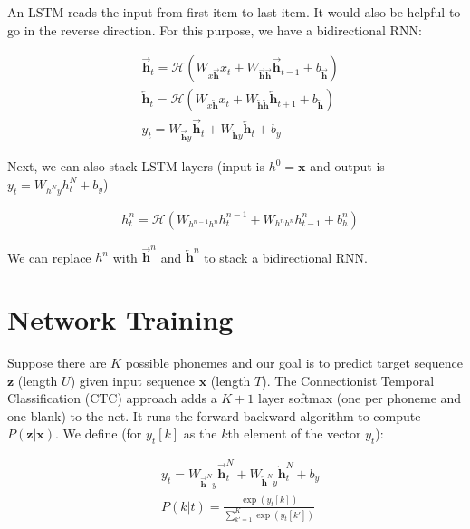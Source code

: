 \documentclass[a4paper]{article}
\begin{document}
An LSTM reads the input from first item to last item. It would also be helpful
to go in the reverse direction. For this purpose, we have a bidirectional RNN:

\begin{align}
  & \overrightarrow{\mathbf{h}}_t = \mathcal{H}(
  W_{x \overrightarrow{\mathbf{h}}} x_t + W_{\overrightarrow{\mathbf{h}} \overrightarrow{\mathbf{h}}}
  \overrightarrow{\mathbf{h}}_{t-1} + b_{\overrightarrow{\mathbf{h}}}
  ) \\
  & \overleftarrow{\mathbf{h}}_t = \mathcal{H}(
  W_{x \overleftarrow{\mathbf{h}}} x_t + W_{\overleftarrow{\mathbf{h}} \overleftarrow{\mathbf{h}}}
  \overleftarrow{\mathbf{h}}_{t+1} + b_{\overleftarrow{\mathbf{h}}}
  ) \\
  & y_t = W_{\overrightarrow{\mathbf{h}} y} \overrightarrow{\mathbf{h}}_t
    + W_{\overleftarrow{\mathbf{h}} y} \overleftarrow{\mathbf{h}}_t + b_y
\end{align}

Next, we can also stack LSTM layers (input is $h^0 = \mathbf{x}$ and output is
$y_t = W_{h^N y} h_t^N + b_y$)

\begin{align}
  & h_t^n =
    \mathcal{H}(W_{h^{n-1} h^{n}} h_t^{n-1} + W_{h^n h^n} h_{t-1}^n + b_h^n)
\end{align}

We can replace $h^n$ with $\overrightarrow{\mathbf{h}}^n$ and $\overleftarrow{\mathbf{h}}^n$ to
stack a bidirectional RNN.

\section{Network Training}
Suppose there are $K$ possible phonemes and our goal is to predict target
sequence $\mathbf{z}$ (length $U$) given input sequence $\mathbf{x}$ (length
$T$). The Connectionist Temporal Classification (CTC) approach adds a $K+1$
layer softmax (one per phoneme and one blank) to the net. It runs the forward
backward algorithm to compute $P(\mathbf{z} | \mathbf{x})$. We define (for
$y_t[k]$ as the $k$th element of the vector $y_t$):

\begin{align}
  & y_t = W_{\overrightarrow{\mathbf{h}}^N y} \overrightarrow{\mathbf{h}}_t^N
  + W_{\overleftarrow{\mathbf{h}}^N y} \overleftarrow{\mathbf{h}}_t^N + b_y \\
  & P(k|t) = \frac{\exp(y_t[k])}{\sum_{k' = 1}^{K}{\exp(y_t[k'])}}
\end{align}
\end{document}
